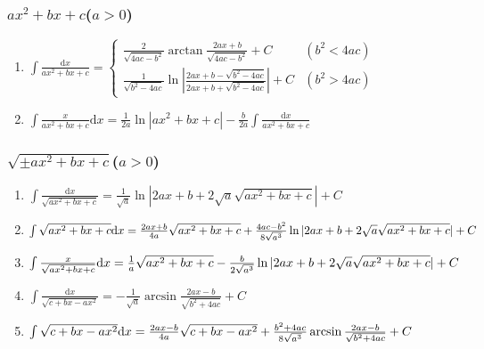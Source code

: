 \newcommand{\md}{\mathrm{d}}
\newcommand{\me}{\mathrm{e}}

\begin{footnotesize}

\subsubsection*{$ax^2+bx+c$($a>0$)}

\begin{enumerate}

\item $ \int \frac{\md x}{ax^2+bx+c} = \begin{cases}
\frac{2}{\sqrt{4ac-b^2}}\arctan\frac{2ax+b}{\sqrt{4ac-b^2}} + C & (b^2 < 4ac) \\
\frac{1}{\sqrt{b^2-4ac}}\ln\left| \frac{2ax+b-\sqrt{b^2-4ac}}{2ax+b+\sqrt{b^2-4ac}} \right| + C & (b^2 > 4ac)
\end{cases} $

\item $ \int \frac{x}{ax^2+bx+c} \md x = \frac{1}{2a} \ln |ax^2+bx+c| - \frac{b}{2a} \int \frac{\md x}{ax^2+bx+c} $

\end{enumerate}

\subsubsection*{$\sqrt{\pm ax^2+bx+c}$($a>0$)}

\begin{enumerate}

\item $ \int \frac{\md x}{\sqrt{ax^2+bx+c}} = \frac{1}{\sqrt{a}} \ln | 2ax+b+2\sqrt{a}\sqrt{ax^2+bx+c} | + C $

\item $ \int \sqrt{ax^2+bx+c} \md x = \frac{2ax+b}{4a}\sqrt{ax^2+bx+c} + \\
	\frac{4ac-b^2}{8\sqrt{a^3}}\ln |2ax+b+2\sqrt{a}\sqrt{ax^2+bx+c}| + C $

\item $ \int \frac{x}{\sqrt{ax^2+bx+c}} \md x = \frac{1}{a}\sqrt{ax^2+bx+c} - \\
	\frac{b}{2\sqrt{a^3}}\ln | 2ax+b+2\sqrt{a}\sqrt{ax^2+bx+c} | + C $

\item $ \int \frac{\md x}{\sqrt{c+bx-ax^2}} = -\frac{1}{\sqrt{a}} \arcsin \frac{2ax-b}{\sqrt{b^2+4ac}} + C  $

\item $ \int \sqrt{c+bx-ax^2} \md x = \frac{2ax-b}{4a}\sqrt{c+bx-ax^2} + \\
	\frac{b^2+4ac}{8\sqrt{a^3}}\arcsin\frac{2ax-b}{\sqrt{b^2+4ac}} + C $


\end{enumerate}
\end{footnotesize}
